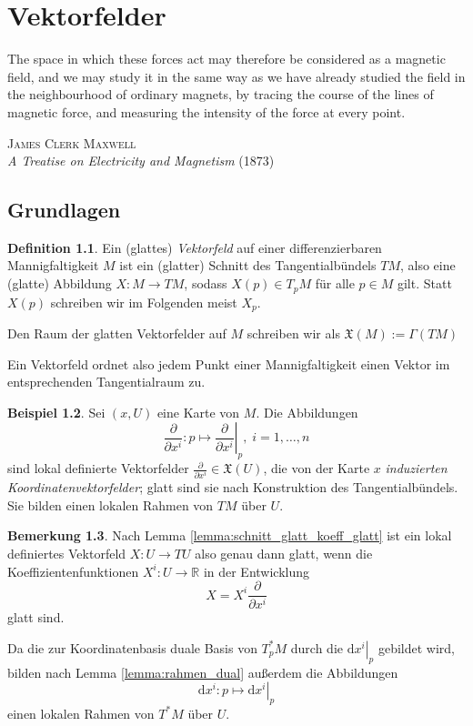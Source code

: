 \documentclass[a4paper]{scrbook}
\numberwithin{equation}{chapter}
\newcommand{\D}{\mathrm{d}}
\newcommand{\R}{\mathbb{R}}
\theoremstyle{definition}
\newtheorem{defn}{Definition}[section]
\newtheorem{bem}[defn]{Bemerkung}
\newtheorem{bsp}[defn]{Beispiel}
\begin{document}
\chapter{Vektorfelder}
\epigraph{The space in which these forces act may therefore be considered as a  magnetic field, and we may study it in the same way as we have already studied the field in the neighbourhood of ordinary magnets, by tracing the course of the lines of magnetic force, and measuring the intensity of the force at every point.}
{\textsc{James Clerk Maxwell}\\\emph{A Treatise on Electricity and Magnetism} (1873)}

\section{Grundlagen}
\begin{defn}
	Ein (glattes) \emph{Vektorfeld} auf einer differenzierbaren Mannigfaltigkeit $M$ ist ein (glatter) Schnitt des Tangentialbündels $TM$, also eine (glatte) Abbildung $X\colon M \to TM$, sodass $X(p) \in T_pM$ für alle $p\in M$ gilt. Statt $X(p)$ schreiben wir im Folgenden meist $X_p$.

	Den Raum der glatten Vektorfelder auf $M$ schreiben wir als $\mathfrak X(M) := \Gamma(TM)$
\end{defn}
Ein Vektorfeld ordnet also jedem Punkt einer Mannigfaltigkeit einen Vektor im entsprechenden Tangentialraum zu.

\begin{bsp}
	Sei $(x,U)$ eine Karte von $M$. Die Abbildungen
	\[\frac{\partial}{\partial x^i}\colon p \mapsto \left.\frac{\partial}{\partial x^i}\right|_p, \; i = 1,\dots,n\]
	sind lokal definierte Vektorfelder $\frac{\partial}{\partial x^i} \in \mathfrak X(U)$, die von der Karte $x$ \emph{induzierten Koordinatenvektorfelder}; glatt sind sie nach Konstruktion des Tangentialbündels. Sie bilden einen lokalen Rahmen von $TM$ über $U$.
\end{bsp}

\begin{bem}
	Nach Lemma \ref{lemma:schnitt_glatt_koeff_glatt} ist ein lokal definiertes Vektorfeld $X\colon U \to TU$ also genau dann glatt, wenn die Koeffizientenfunktionen $X^i\colon U \to \R$ in der Entwicklung
	\[X = X^i \frac{\partial}{\partial x^i}\]
	glatt sind.

	Da die zur Koordinatenbasis duale Basis von $T_p^*M$ durch die $\left.\D x^i\right|_p$ gebildet wird, bilden nach Lemma \ref{lemma:rahmen_dual} außerdem die Abbildungen
	\[\D x^i\colon p \mapsto \left.\D x^i\right|_p\]
	einen lokalen Rahmen von $T^*M$ über $U$.
\end{bem}
\end{document}
